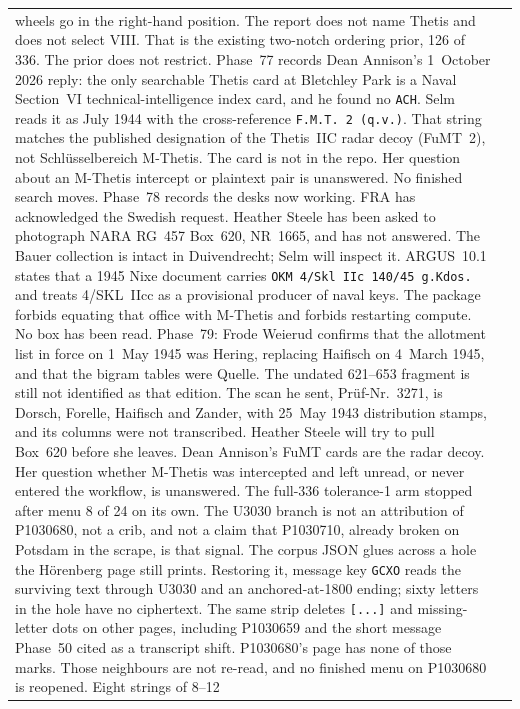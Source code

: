 \documentclass[11pt,a4paper]{article}
\begin{document}
{\begin{longtable}{@{}p{}p{}@{}}
  wheels go in the right-hand position. The report does not name Thetis
  and does not select VIII. That is the existing two-notch ordering prior,
  126 of 336. The prior does not restrict. Phase~77 records Dean Annison's
  1~October 2026 reply: the only searchable Thetis card at Bletchley Park
  is a Naval Section~VI technical-intelligence index card, and he found
  no \texttt{ACH}. Selm reads it as July 1944 with the cross-reference
  \texttt{F.M.T. 2 (q.v.)}. That string matches the published designation
  of the Thetis~IIC radar decoy (FuMT~2), not Schl\"usselbereich M-Thetis.
  The card is not in the repo. Her question about an M-Thetis intercept
  or plaintext pair is unanswered. No finished search moves.
  Phase~78 records the desks now working. FRA has acknowledged the Swedish
  request. Heather Steele has been asked to photograph NARA RG~457 Box~620,
  NR~1665, and has not answered. The Bauer collection is intact in
  Duivendrecht; Selm will inspect it. ARGUS~10.1 states that a 1945 Nixe
  document carries \texttt{OKM 4/Skl IIc 140/45 g.Kdos.} and treats 4/SKL~IIcc
  as a provisional producer of naval keys. The package forbids equating that
  office with M-Thetis and forbids restarting compute. No box has been read.
  Phase~79: Frode Weierud confirms that the allotment list in force on
  1~May 1945 was Hering, replacing Haifisch on 4~March 1945, and that the
  bigram tables were Quelle. The undated 621--653 fragment is still not
  identified as that edition. The scan he sent, Pr\"uf-Nr.~3271, is
  Dorsch, Forelle, Haifisch and Zander, with 25~May 1943 distribution
  stamps, and its columns were not transcribed. Heather Steele will try
  to pull Box~620 before she leaves. Dean Annison's FuMT cards are the
  radar decoy. Her question whether M-Thetis was intercepted and left
  unread, or never entered the workflow, is unanswered.
  The full-336 tolerance-1 arm
  stopped after menu 8 of 24 on its own. The U3030 branch is not an attribution of P1030680, not a crib, and not
  a claim that P1030710, already broken on Potsdam in the scrape, is that
  signal. The corpus JSON glues across a hole the Hörenberg page still prints.
  Restoring it, message key \texttt{GCXO} reads the surviving text through
  U3030 and an anchored-at-1800 ending; sixty letters in the hole have no
  ciphertext. The same strip deletes \texttt{[...]} and missing-letter dots on other
  pages, including P1030659 and the short message Phase~50 cited as a transcript
  shift. P1030680's page has none of those marks. Those neighbours are not
  re-read, and no finished menu on P1030680 is reopened. Eight strings of 8--12

\end{longtable}}
\end{document}
